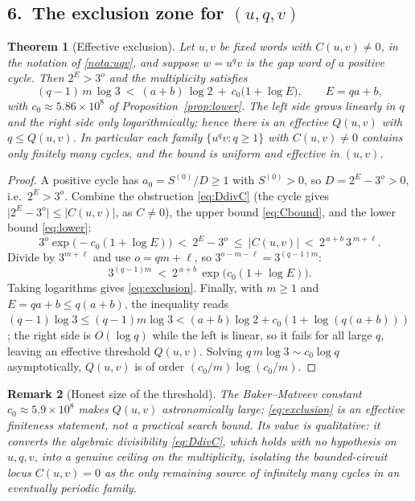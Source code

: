 \documentclass[11pt,a4paper]{article}
\theoremstyle{bourbaki}
\newtheorem{thm}{Theorem}[section]
\theoremstyle{bourbakidef}
\newtheorem{rem}[thm]{Remark}
\begin{document}
\subsection*{6.\ The exclusion zone for $(u,q,v)$}

\begin{thm}[Effective exclusion]\label{thm:exclusion}
Let $u,v$ be fixed words with $C(u,v)\ne 0$, in the notation of \ref{nota:uqv}, and suppose
$w=u^{q}v$ is the gap word of a \emph{positive} cycle. Then $2^{E}>3^{o}$ and the
multiplicity satisfies
\begin{equation}\label{eq:exclusion}
   (q-1)\,m\,\log 3\ <\ (a+b)\,\log 2\ +\ c_{0}\bigl(1+\log E\bigr),
   \qquad E=qa+b,
\end{equation}
with $c_{0}\approx 5.86\times 10^{8}$ of Proposition~\ref{prop:lower}. The left side grows
linearly in $q$ and the right side only logarithmically; hence there is an effective
$Q(u,v)$ with $q\le Q(u,v)$. In particular each family $\{u^{q}v:q\ge1\}$ with $C(u,v)\ne0$
contains only finitely many cycles, and the bound is uniform and effective in $(u,v)$.
\end{thm}

\begin{proof}
A positive cycle has $a_{0}=S^{(0)}/D\ge 1$ with $S^{(0)}>0$, so $D=2^{E}-3^{o}>0$, i.e.\
$2^{E}>3^{o}$. Combine the obstruction \eqref{eq:DdivC} (the cycle gives
$\lvert 2^{E}-3^{o}\rvert\le\lvert C(u,v)\rvert$, as $C\ne0$), the upper bound
\eqref{eq:Cbound}, and the lower bound \eqref{eq:lower}:
\[
   3^{o}\exp\!\bigl(-c_{0}(1+\log E)\bigr)\ <\ 2^{E}-3^{o}\ \le\ \lvert C(u,v)\rvert
   \ <\ 2^{\,a+b}\,3^{\,m+\ell}.
\]
Divide by $3^{m+\ell}$ and use $o=qm+\ell$, so $3^{o-m-\ell}=3^{(q-1)m}$:
\[
   3^{(q-1)m}\ <\ 2^{\,a+b}\,\exp\!\bigl(c_{0}(1+\log E)\bigr).
\]
Taking logarithms gives \eqref{eq:exclusion}. Finally, with $m\ge1$ and $E=qa+b\le q(a+b)$,
the inequality reads $(q-1)\log 3\le(q-1)m\log3<(a+b)\log2+c_{0}(1+\log(q(a+b)))$; the
right side is $O(\log q)$ while the left is linear, so it fails for all large $q$, leaving
an effective threshold $Q(u,v)$. Solving $q\,m\log3\sim c_{0}\log q$ asymptotically,
$Q(u,v)$ is of order $(c_{0}/m)\log(c_{0}/m)$.
\end{proof}

\begin{rem}[Honest size of the threshold]
The Baker--Matveev constant $c_{0}\approx 5.9\times10^{8}$ makes $Q(u,v)$ astronomically
large; \eqref{eq:exclusion} is an \emph{effective finiteness} statement, not a practical
search bound. Its value is qualitative: it converts the algebraic divisibility
\eqref{eq:DdivC}, which holds with no hypothesis on $u,q,v$, into a genuine ceiling on the
multiplicity, isolating the bounded-circuit locus $C(u,v)=0$ as the only remaining source
of infinitely many cycles in an eventually periodic family.
\end{rem}
\end{document}
